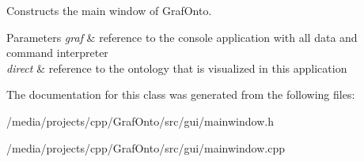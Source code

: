 \-Constructs the main window of \-Graf\-Onto. 


\begin{DoxyParams}{\-Parameters}
{\em graf} & reference to the console application with all data and command interpreter \\
\hline
{\em direct} & reference to the ontology that is visualized in this application \\
\hline
\end{DoxyParams}


\-The documentation for this class was generated from the following files\-:\begin{DoxyCompactItemize}
\item 
/media/projects/cpp/\-Graf\-Onto/src/gui/mainwindow.\-h\item 
/media/projects/cpp/\-Graf\-Onto/src/gui/mainwindow.\-cpp\end{DoxyCompactItemize}
